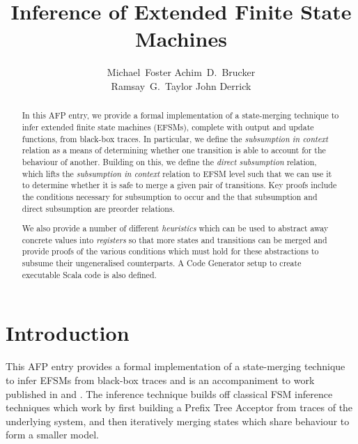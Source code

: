 \documentclass[10pt,DIV16,a4paper,abstract=true,twoside=semi,openright]{scrreprt}
\title{Inference of Extended Finite State Machines}%
\author{%
\begin{minipage}{.8\textwidth}
  \centering
      Michael~Foster\footnotemark[1]\orcidID{0000-0001-8233-9873}%
      \qquad\qquad%
      Achim~D.~Brucker\footnotemark[2]\orcidID{0000-0002-6355-1200}%
      \\%
      Ramsay~G.~Taylor\footnotemark[1]\orcidID{0000-0002-4036-7590}%
      \qquad\qquad%
      John Derrick\footnotemark[1]\orcidID{0000-0002-6631-8914}%
     \end{minipage}
}
\begin{document}
\maketitle
\begin{abstract}
  In this AFP entry, we provide a formal implementation of a state-merging technique to infer extended finite state machines (EFSMs), complete with output and update functions, from black-box traces. In particular, we define the \emph{subsumption in context} relation as a means of determining whether one transition is able to account for the behaviour of another. Building on this, we define the \emph{direct subsumption} relation, which lifts the \emph{subsumption in context} relation to EFSM level such that we can use it to determine whether it is safe to merge a given pair of transitions. Key proofs include the conditions necessary for subsumption to occur and the that subsumption and direct subsumption are preorder relations.

  We also provide a number of different \emph{heuristics} which can be used to abstract away concrete values into \emph{registers} so that more states and transitions can be merged and provide proofs of the various conditions which must hold for these abstractions to subsume their ungeneralised counterparts. A Code Generator setup to create executable Scala code is also defined.
  \begin{quote}
    \bigskip
  \end{quote}
\end{abstract}


\tableofcontents
\cleardoublepage

\chapter{Introduction}\label{chap:intro}
This AFP entry provides a formal implementation of a state-merging technique to infer EFSMs from black-box traces and is an accompaniment to work published in \cite{foster2018} and \cite{foster2019}. The inference technique builds off classical FSM inference techniques which work by first building a Prefix Tree Acceptor from traces of the underlying system, and then iteratively merging states which share behaviour to form a smaller model.
\end{document}

